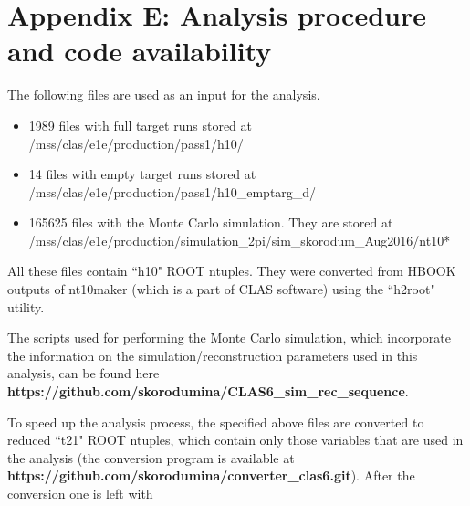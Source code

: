\newpage

\renewcommand{\thesection}{E}
    \makeatletter
   \renewcommand{\theequation}{\thesection.\@arabic\c@equation}
    \makeatother
\section*{Appendix E: Analysis procedure and code availability}
\label{app_code}

The following files are used as an input for the analysis.\vspace{-1em}

\begin{itemize}
\item 1989 files with full target runs stored at\\[-0.75mm]
 /mss/clas/e1e/production/pass1/h10/\vspace{-0.7em}
\item 14 files with empty target runs stored at\\[-0.75mm]
/mss/clas/e1e/production/pass1/h10\_emptarg\_d/\vspace{-0.7em}
\item 165625 files with the Monte Carlo simulation. They are stored at\\[-0.75mm]
/mss/clas/e1e/production/simulation\_2pi/sim\_skorodum\_Aug2016/nt10*
\vspace{-0.5em}
\end{itemize}


All these files contain ``h10" ROOT ntuples. They were converted from HBOOK outputs of nt10maker (which is a part of CLAS software) using the ``h2root" utility.

The scripts used for performing the Monte Carlo simulation, which incorporate the information on the simulation/reconstruction parameters used in this analysis, can be found here {\bf https://github.com/skorodumina/CLAS6\_sim\_rec\_sequence}.





To speed up the analysis process, the specified above files are converted to reduced ``t21" ROOT ntuples, which contain only those variables that are used in the analysis (the conversion program is available at {\bf https://github.com/skorodumina/converter\_clas6.git}). After the conversion one is left with \vspace{-1em}

